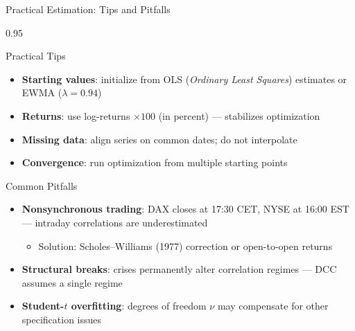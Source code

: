 \documentclass[9pt, aspectratio=169, t]{beamer}
\begin{document}
\begin{frame}{Practical Estimation: Tips and Pitfalls}
    \begin{cminipage}{0.95\textwidth}
    {\footnotesize
    \begin{block}{Practical Tips}
        \begin{itemize}\setlength{\itemsep}{0pt}
            \item \textbf{Starting values}: initialize from OLS (\textit{Ordinary Least Squares}) estimates or EWMA ($\lambda = 0.94$)
            \item \textbf{Returns}: use log-returns $\times 100$ (in percent) --- stabilizes optimization
            \item \textbf{Missing data}: align series on common dates; do not interpolate
            \item \textbf{Convergence}: run optimization from multiple starting points
        \end{itemize}
    \end{block}
    \begin{alertblock}{Common Pitfalls}
        \begin{itemize}\setlength{\itemsep}{0pt}
            \item \textbf{Nonsynchronous trading}: DAX closes at 17:30 CET, NYSE at 16:00 EST --- intraday correlations are underestimated
                \begin{itemize}\setlength{\itemsep}{0pt}
                    \item Solution: Scholes--Williams (1977) correction or open-to-open returns
                \end{itemize}
            \item \textbf{Structural breaks}: crises permanently alter correlation regimes --- DCC assumes a single regime
            \item \textbf{Student-$t$ overfitting}: degrees of freedom $\nu$ may compensate for other specification issues
        \end{itemize}
    \end{alertblock}
    }
    \end{cminipage}
\end{frame}
\end{document}
